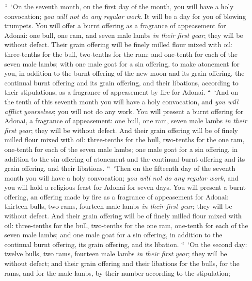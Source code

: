\begin{biblechapter} %
 “ ‘On the seventh month, on the first day of the month, you will have a holy convocation; \textit{you will not do any regular work}. It will be a day for you of blowing trumpets.
\verse You will offer a burnt offering as a fragrance of appeasement for Adonai: one bull, one ram, and seven male lambs \textit{in their first year}; they will be without defect.
\verse Their grain offering will be finely milled flour mixed with oil: three-tenths for the bull, two-tenths for the ram;
\verse and one-tenth for each of the seven male lambs;
\verse with one male goat for a sin offering, to make atonement for you,
\verse in addition to the burnt offering of the new moon and its grain offering, the continual burnt offering and its grain offering, and their libations, according to their stipulations, as a fragrance of appeasement by fire for Adonai.
 “ ‘And on the tenth of this seventh month you will have a holy convocation, and \textit{you will afflict yourselves}; you will not do any work.
\verse You will present a burnt offering for Adonai, a fragrance of appeasement: one bull, one ram, seven male lambs \textit{in their first year}; they will be without defect.
\verse And their grain offering will be of finely milled flour mixed with oil: three-tenths for the bull, two-tenths for the one ram,
\verse one-tenth for each of the seven male lambs;
\verse one male goat for a sin offering, in addition to the sin offering of atonement and the continual burnt offering and its grain offering, and their libations.
\verse “ ‘Then on the fifteenth day of the seventh month you will have a holy convocation; \textit{you will not do any regular work}, and you will hold a religious feast for Adonai for seven days.
\verse You will present a burnt offering, an offering made by fire as a fragrance of appeasement for Adonai: thirteen bulls, two rams, fourteen male lambs \textit{in their first year}; they will be without defect.
\verse And their grain offering will be of finely milled flour mixed with oil: three-tenths for the bull, two-tenths for the one ram,
\verse one-tenth for each of the seven male lambs;
\verse and one male goat for a sin offering, in addition to the continual burnt offering, its grain offering, and its libation.
\verse “ ‘On the second day: twelve bulls, two rams, fourteen male lambs \textit{in their first year}; they will be without defect;
\verse and their grain offering and their libations for the bulls, for the rams, and for the male lambs, by their number according to the stipulation;

\end{biblechapter}
